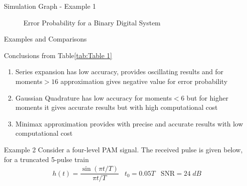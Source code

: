 \documentclass{beamer}
\begin{document}
\begin{frame}{Simulation Graph - Example 1}
\begin{figure}
    \caption{Error Probability for a Binary Digital System}
    \label{fig.2}
\end{figure}
\end{frame}
\begin{frame}{Examples and Comparisons}
\begin{block}{Conclusions from Table\eqref{tab:Table 1}}
\begin{enumerate}[]
\item Series expansion has low accuracy, provides oscillating results and for moments$>16$ approximation gives
      negative value for error probability
\item Gaussian Quadrature has low accuracy for moments$<6$ but for higher moments it gives accurate results
      but with high computational cost
\item Minimax approximation provides with precise and accurate results with low computational cost
\end{enumerate}
\end{block}
\begin{block}{Example 2}
Consider a four-level PAM signal. The received pulse is given below, for a truncated 5-pulse train
\begin{align}
h(t) = \dfrac{\sin{(\pi t/T)}}{\pi t/T}\;\;\;t_{0} = 0.05T \;\;\; \text{SNR}= 24\;dB
\end{align}
\end{block}
\end{frame}
\end{document}
